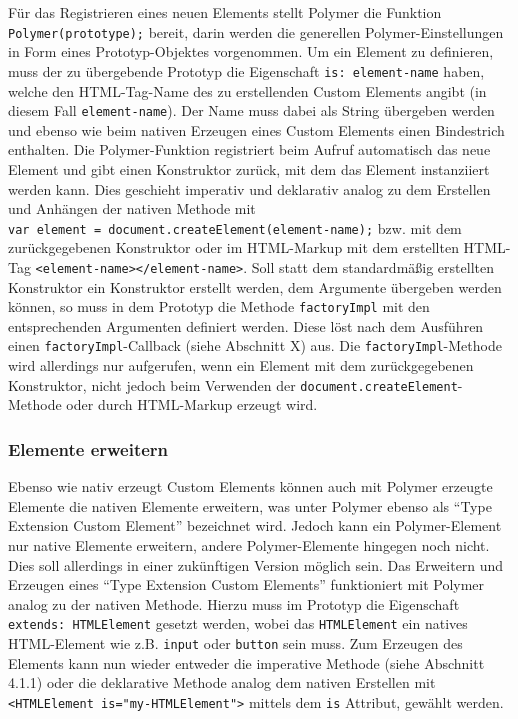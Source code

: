 \documentclass[]{article}
\begin{document}
Für das Registrieren eines neuen Elements stellt Polymer die Funktion
\texttt{Polymer(prototype);} bereit, darin werden die generellen
Polymer-Einstellungen in Form eines Prototyp-Objektes vorgenommen. Um
ein Element zu definieren, muss der zu übergebende Prototyp die
Eigenschaft
\texttt{is:\ \textquotesingle{}element-name\textquotesingle{}} haben,
welche den HTML-Tag-Name des zu erstellenden Custom Elements angibt (in
diesem Fall \texttt{element-name}). Der Name muss dabei als String
übergeben werden und ebenso wie beim nativen Erzeugen eines Custom
Elements einen Bindestrich enthalten. Die Polymer-Funktion registriert
beim Aufruf automatisch das neue Element und gibt einen Konstruktor
zurück, mit dem das Element instanziiert werden kann. Dies geschieht
imperativ und deklarativ analog zu dem Erstellen und Anhängen der
nativen Methode mit
\texttt{var\ element\ =\ document.createElement(\textquotesingle{}element-name\textquotesingle{});}
bzw. mit dem zurückgegebenen Konstruktor oder im HTML-Markup mit dem
erstellten HTML-Tag
\texttt{\textless{}element-name\textgreater{}\textless{}/element-name\textgreater{}}.
Soll statt dem standardmäßig erstellten Konstruktor ein Konstruktor
erstellt werden, dem Argumente übergeben werden können, so muss in dem
Prototyp die Methode \texttt{factoryImpl} mit den entsprechenden
Argumenten definiert werden. Diese löst nach dem Ausführen einen
\texttt{factoryImpl}-Callback (siehe Abschnitt X) aus. Die
\texttt{factoryImpl}-Methode wird allerdings nur aufgerufen, wenn ein
Element mit dem zurückgegebenen Konstruktor, nicht jedoch beim Verwenden
der \texttt{document.createElement}-Methode oder durch HTML-Markup
erzeugt wird.

\subsubsection{Elemente erweitern}\label{elemente-erweitern}

Ebenso wie nativ erzeugt Custom Elements können auch mit Polymer
erzeugte Elemente die nativen Elemente erweitern, was unter Polymer
ebenso als ``Type Extension Custom Element'' bezeichnet wird. Jedoch
kann ein Polymer-Element nur native Elemente erweitern, andere
Polymer-Elemente hingegen noch nicht. Dies soll allerdings in einer
zukünftigen Version möglich sein. Das Erweitern und Erzeugen eines
``Type Extension Custom Elements'' funktioniert mit Polymer analog zu
der nativen Methode. Hierzu muss im Prototyp die Eigenschaft
\texttt{extends:\ \textquotesingle{}HTMLElement\textquotesingle{}}
gesetzt werden, wobei das
\texttt{\textquotesingle{}HTMLElement\textquotesingle{}} ein natives
HTML-Element wie z.B. \texttt{input} oder \texttt{button} sein muss. Zum
Erzeugen des Elements kann nun wieder entweder die imperative Methode
(siehe Abschnitt 4.1.1) oder die deklarative Methode analog dem nativen
Erstellen mit
\texttt{\textless{}HTMLElement\ is="my-HTMLElement"\textgreater{}}
mittels dem \texttt{is} Attribut, gewählt werden.
\end{document}
